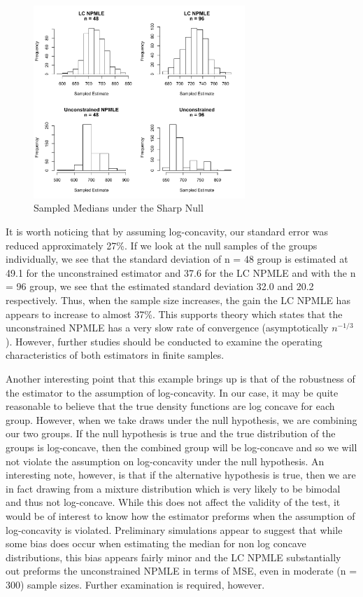 \begin{figure}
\centerline{\includegraphics[width = 8cm]{MedianHist.pdf}}
\caption{Sampled Medians under the Sharp Null}
\end{figure}		

	It is worth noticing that by assuming log-concavity, our standard error was reduced approximately 27\%. If we look at the null samples of the groups individually, we see that the standard deviation of n = 48 group is estimated at 49.1 for the unconstrained estimator and 37.6 for the LC NPMLE and with the n = 96 group, we see that the estimated standard deviation 32.0 and 20.2 respectively. Thus, when the sample size increases, the gain the LC NPMLE has appears to increase to almost 37\%. This supports theory which states that the unconstrained NPMLE has a very slow rate of convergence (asymptotically $n^{-1/3}$). However, further studies should be conducted to examine the operating characteristics of both estimators in finite samples.
	
	Another interesting point that this example brings up is that of the robustness of the estimator to the assumption of log-concavity. In our case, it may be quite reasonable to believe that the true density functions are log concave for each group. However, when we take draws under the null hypothesis, we are combining our two groups. If the null hypothesis is true and the true distribution of the groups is log-concave, then the combined group will be log-concave and so we will not violate the assumption on log-concavity under the null hypothesis. An interesting note, however, is that if the alternative hypothesis is true, then we are in fact drawing from a mixture distribution which is very likely to be bimodal and thus not log-concave. While this does not affect the validity of the test, it would be of interest to know how the estimator preforms when the assumption of log-concavity is violated. Preliminary simulations appear to suggest that while some bias does occur when estimating the median for non log concave distributions, this bias appears fairly minor and the LC NPMLE substantially out preforms the unconstrained NPMLE in terms of MSE, even in moderate (n = 300) sample sizes. Further examination is required, however.



